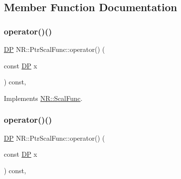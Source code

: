 \subsection{Member Function Documentation}
\mbox{\label{classNR_1_1PtrScalFunc_a661b2194b67e1e0e0de15389f0cea5f1}} 
\subsubsection{\texorpdfstring{operator()()}{operator()()}\hspace{0.1cm}{\footnotesize\ttfamily [1/3]}}
{\footnotesize\ttfamily \mbox{\hyperlink{namespaceNR_af6ff762dd605ff477b8e52387253a02a}{DP}} N\+R\+::\+Ptr\+Scal\+Func\+::operator() (\begin{DoxyParamCaption}\item[{const \mbox{\hyperlink{namespaceNR_af6ff762dd605ff477b8e52387253a02a}{DP}}}]{x }\end{DoxyParamCaption}) const\hspace{0.3cm}{\ttfamily [inline]}, {\ttfamily [virtual]}}



Implements \mbox{\hyperlink{classNR_1_1ScalFunc_a7dae30ac413c03bb0acfae13b7abb57e}{N\+R\+::\+Scal\+Func}}.

\mbox{\label{classNR_1_1PtrScalFunc_a661b2194b67e1e0e0de15389f0cea5f1}} 
\subsubsection{\texorpdfstring{operator()()}{operator()()}\hspace{0.1cm}{\footnotesize\ttfamily [2/3]}}
{\footnotesize\ttfamily \mbox{\hyperlink{namespaceNR_af6ff762dd605ff477b8e52387253a02a}{DP}} N\+R\+::\+Ptr\+Scal\+Func\+::operator() (\begin{DoxyParamCaption}\item[{const \mbox{\hyperlink{namespaceNR_af6ff762dd605ff477b8e52387253a02a}{DP}}}]{x }\end{DoxyParamCaption}) const\hspace{0.3cm}{\ttfamily [inline]}, {\ttfamily [virtual]}}



